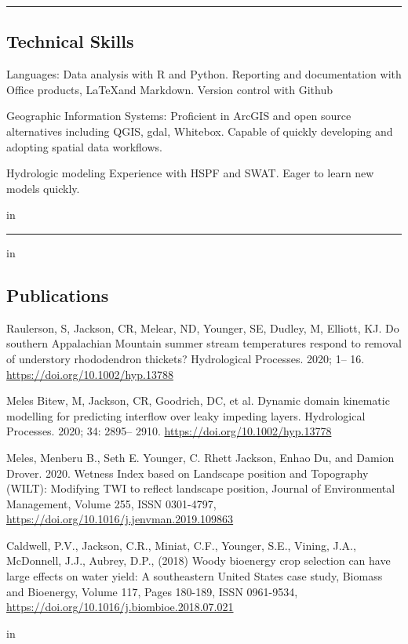 \documentclass[10pt,letterpaper]{article}
\newenvironment{indentsection}[1]%
{\begin{list}{}%
	{\setlength{\leftmargin}{#1}}%
	\item[]%
}
{\end{list}}
\begin{document}
\pagebreak

\hrule
\vspace{-0.4em}
\subsection*{Technical Skills}

\begin{indentsection}{\parindent}
	\begin{description*}
		\item[Languages:]
		Data analysis with R and Python. Reporting and documentation with Office products, \LaTeX and Markdown. Version control with Github
		\item[Geographic Information Systems:]
		Proficient in ArcGIS and open source alternatives including QGIS, gdal, Whitebox. Capable of quickly developing and adopting spatial data workflows.
		\item[Hydrologic modeling]
		Experience with HSPF and SWAT. Eager to learn new models quickly.
	\end{description*}
\end{indentsection}
		
		\vspace{-0.4em}
		 in
		
\hrule
\vspace{-0.4em}
 in
\subsection*{Publications}

\begin{hangparas}{.25in}{1}

Raulerson, S, Jackson, CR, Melear, ND, Younger, SE, Dudley, M, Elliott, KJ. Do southern Appalachian Mountain summer stream temperatures respond to removal of understory rhododendron thickets? Hydrological Processes. 2020; 1– 16. \url{https://doi.org/10.1002/hyp.13788}

Meles Bitew, M, Jackson, CR, Goodrich, DC, et al. Dynamic domain kinematic modelling for predicting interflow over leaky impeding layers. Hydrological Processes. 2020; 34: 2895– 2910. \url{https://doi.org/10.1002/hyp.13778}

Meles, Menberu B., Seth E. Younger, C. Rhett Jackson, Enhao Du, and Damion Drover. 2020. Wetness Index based on Landscape position and Topography (WILT): Modifying TWI to reflect landscape position, Journal of Environmental Management, Volume 255, ISSN 0301-4797, \url{https://doi.org/10.1016/j.jenvman.2019.109863}

Caldwell, P.V., Jackson, C.R., Miniat, C.F., Younger, S.E., Vining, J.A., McDonnell, J.J., Aubrey, D.P., (2018) Woody bioenergy crop selection can have large effects on water yield: A southeastern United States case study,
Biomass and Bioenergy, Volume 117, Pages 180-189, ISSN 0961-9534, \url{https://doi.org/10.1016/j.biombioe.2018.07.021}

 in
\vspace{-0.4em}

\end{hangparas}
\end{document}
